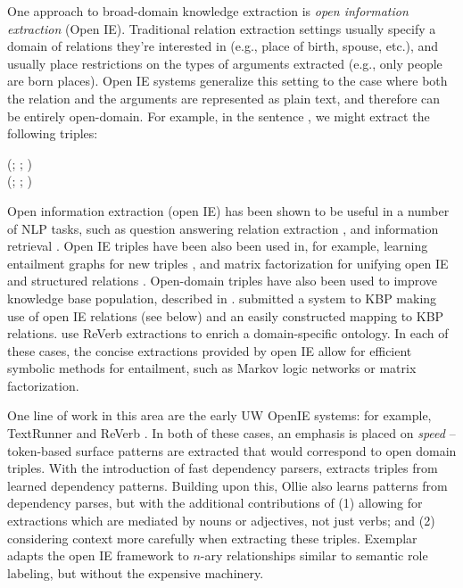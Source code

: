 %
%
One approach to broad-domain knowledge extraction is \textit{open information extraction} (Open IE).
Traditional relation extraction settings usually specify a domain of relations they're
  interested in (e.g., place of birth, spouse, etc.), and usually place restrictions on the
  types of arguments extracted (e.g., only people are born places).
Open IE systems generalize this setting to the case where both the relation and the arguments
  are represented as plain text, and therefore can be entirely open-domain.
For example, in the sentence , we might extract
  the following triples:

\begin{displayquote}
  (; ; ) \\
  (; ; )
\end{displayquote}

Open information extraction (open IE) has been shown to be useful in a number of NLP tasks, such
  as question answering \cite{key:2014fader-openqa} relation 
  extraction \cite{key:2013soderland-kbp},
  and information retrieval \cite{key:2011etzioni-nature}. 
Open IE triples have been also been used in,
  for example, learning entailment graphs for new triples
  \cite{key:2011berant-entailment}, and
  matrix factorization for unifying open IE and structured relations
  \cite{key:2012yao-schemas,key:2013riedel-schemas}.
Open-domain triples have also been used to improve knowledge base population,
  described in .
 submitted a system to KBP making use of
  open IE relations (see below) and an easily constructed mapping to KBP relations.
 use ReVerb extractions to 
    enrich a domain-specific ontology.
In each of these cases, the concise extractions provided by open IE allow
  for efficient symbolic methods for entailment, such as Markov logic
  networks or matrix factorization.


One line of work in this area are the early UW OpenIE systems: for example,
  TextRunner \cite{key:2007yates-textrunner} and
  ReVerb \cite{key:2011fader-reverb}.
In both of these cases, an emphasis is placed on \textit{speed} --
  token-based surface patterns are extracted that would correspond to
  open domain triples.
With the introduction of fast dependency parsers,
  \cite{key:2010wu-openie} extracts triples from
  learned dependency patterns.
Building upon this, Ollie \cite{key:2012mausam-ollie} also learns patterns from dependency
  parses, but with the additional contributions of (1) allowing for extractions which are
  mediated by nouns or adjectives, not just verbs; and (2) considering context more carefully
  when extracting these triples.
Exemplar \cite{key:2013mesquita-exemplar} adapts the open IE framework to
  $n$-ary relationships similar to semantic role labeling, but without the
  expensive machinery.


